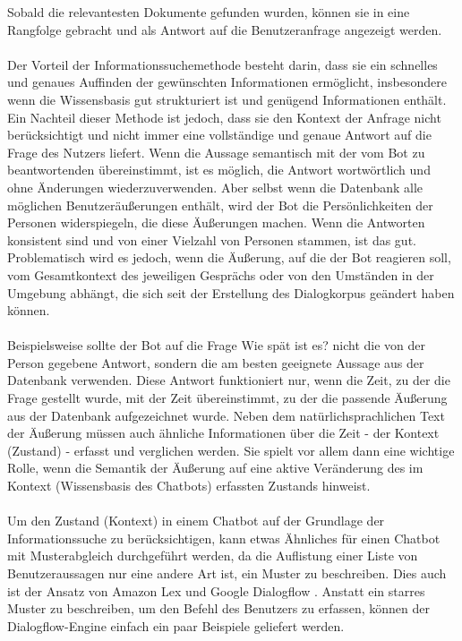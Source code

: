 Sobald die relevantesten Dokumente gefunden wurden, können sie in eine Rangfolge gebracht und als Antwort auf die Benutzeranfrage angezeigt werden.\\\\
Der Vorteil der Informationssuchemethode besteht darin, dass sie ein schnelles und genaues Auffinden der gewünschten Informationen ermöglicht, insbesondere wenn die Wissensbasis gut strukturiert ist und genügend Informationen enthält. 
Ein Nachteil dieser Methode ist jedoch, dass sie den Kontext der Anfrage nicht berücksichtigt und nicht immer eine vollständige und genaue Antwort auf die Frage des Nutzers liefert. 
Wenn die Aussage semantisch mit der vom Bot zu beantwortenden übereinstimmt, ist es möglich, die Antwort wortwörtlich und ohne Änderungen wiederzuverwenden. 
Aber selbst wenn die Datenbank alle möglichen Benutzeräußerungen enthält, wird der Bot die Persönlichkeiten der Personen widerspiegeln, die diese Äußerungen machen. 
Wenn die Antworten konsistent sind und von einer Vielzahl von Personen stammen, ist das gut. 
Problematisch wird es jedoch, wenn die Äußerung, auf die der Bot reagieren soll, vom Gesamtkontext des jeweiligen Gesprächs oder von den Umständen in der Umgebung abhängt, die sich seit der Erstellung des Dialogkorpus geändert haben können.\\\\
Beispielsweise sollte der Bot auf die Frage \glqq{}Wie spät ist es?\grqq{} nicht die von der Person gegebene Antwort, sondern die am besten geeignete Aussage aus der Datenbank verwenden. 
Diese Antwort funktioniert nur, wenn die Zeit, zu der die Frage gestellt wurde, mit der Zeit übereinstimmt, zu der die passende Äußerung aus der Datenbank aufgezeichnet wurde. 
Neben dem natürlichsprachlichen Text der Äußerung müssen auch ähnliche Informationen über die Zeit - der Kontext (Zustand) - erfasst und verglichen werden. 
Sie spielt vor allem dann eine wichtige Rolle, wenn die Semantik der Äußerung auf eine aktive Veränderung des im Kontext (Wissensbasis des Chatbots) erfassten Zustands hinweist.\\\\
Um den Zustand (Kontext) in einem Chatbot auf der Grundlage der Informationssuche zu berücksichtigen, kann etwas Ähnliches für einen Chatbot mit Musterabgleich durchgeführt werden, da die Auflistung einer Liste von Benutzeraussagen nur eine andere Art ist, ein Muster zu beschreiben. 
Dies auch ist der Ansatz von Amazon Lex \cite{amazon_lex} und Google Dialogflow \cite{dialogflow_chawla}. 
Anstatt ein starres Muster zu beschreiben, um den Befehl des Benutzers zu erfassen, können der Dialogflow-Engine einfach ein paar Beispiele geliefert werden. 
